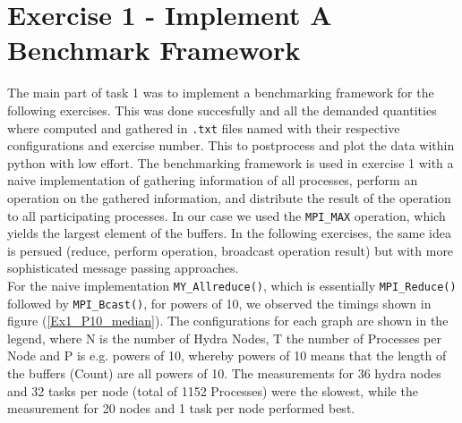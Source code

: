 \section{Exercise 1 - Implement A Benchmark Framework}

The main part of task 1 was to implement a benchmarking framework for the following exercises. This was done succesfully 
and all the demanded quantities where computed and gathered in \texttt{.txt} files named with their respective
 configurations and exercise number. This to postprocess and plot the data within python with low effort. 
 The benchmarking framework is used in exercise 1 with a naive implementation of gathering information of all processes, 
 perform an operation on the gathered information, and distribute the result of the operation to all 
 participating processes. In our case we used the \texttt{MPI\_MAX} operation, which yields the largest 
 element of the buffers. In the following exercises, the same idea is persued (reduce, perform operation, 
 broadcast operation result) but with more sophisticated message passing approaches. \\

For the naive implementation \texttt{MY\_Allreduce()}, which is essentially \texttt{MPI\_Reduce()} followed 
by \texttt{MPI\_Bcast()}, for powers of 10, we observed the timings shown in figure (\ref{Ex1_P10_median}).
The configurations for each graph are shown in the legend, where N is the number of Hydra Nodes, T 
the number of Processes per Node and P is e.g. powers of 10, whereby powers of 10 means that the length 
of the buffers (Count) are all powers of 10. The measurements for 36 hydra nodes and 32 tasks per node (total of 1152 \MPI 
Processes) were the slowest, while the measurement for 20 nodes and 1 task per node performed best.

